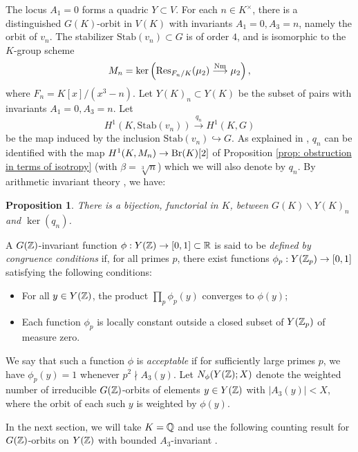 \documentclass[11pt,a4paper]{amsart}
\def\Z{{\rm \mathbb{Z}}}
\def\Q{{\rm \mathbb{Q}}}
\def\R{{\rm \mathbb{R}}}
\def\Nm{{\rm Nm}}
\def\Br{{\rm Br}}
\def\Res{{\rm Res}}
\numberwithin{equation}{section}
\newtheorem{proposition}[theorem]{Proposition}
\begin{document}
The locus $A_1 = 0$ forms a quadric $Y \subset V$. 
For each $n \in K^\times$, there is a distinguished $G(K)$-orbit in $V(K)$ with invariants $A_1 = 0,A_3 = n$, namely the orbit of $v_n$.  The stabilizer $\mathrm{Stab}(v_n) \subset G$ is of order $4$, and is isomorphic to the $K$-group scheme 
\[M_n = \ker\left(\Res_{F_n/K}(\mu_2) \stackrel{\Nm}{\longrightarrow} \mu_2\right),\]
where $F_n = K[x]/(x^3 - n)$.  Let $Y(K)_n \subset Y(K)$ be the subset of pairs with invariants $A_1 = 0,A_3 = n$. Let \[H^1(K, \mathrm{Stab}(v_n)) \stackrel{q_n}{\longrightarrow} H^1(K, G)\]
be the map induced by the inclusion $\mathrm{Stab}(v_n) \hookrightarrow G$. As explained in \cite{BhargavaGross2013}, $q_n$ can be identified with the map $H^1(K, M_n) \to \Br(K)[2]$ of Proposition \ref{prop: obstruction in terms of isotropy} (with $\beta = \sqrt[3]{n}$) which we will also denote by $q_n$. 
 By arithmetic invariant theory \cite[Proposition 1]{BhargavaGross2014}, we have:

\begin{proposition}\label{prop: parameterization}
There is a bijection, functorial in $K$, between $G(K)\backslash Y(K)_n$ and $\ker(q_n)$.
\end{proposition}




A $G(\Z)$-invariant function $\phi:Y({\Z})\to[0,1]\subset \R$ is said to be {\it defined by congruence conditions} if, for all primes $p$, there exist functions $\phi_p:Y({\Z_p})\to[0,1]$ satisfying the following conditions:
\begin{itemize}
\item[(1)] For all $y\in Y(\Z)$, the product $\prod_p\phi_p(y)$ converges to $\phi(y)$;
\item[(2)] Each function $\phi_p$ is 
locally constant outside a closed subset of $Y({\Z_p})$ of measure zero.
\end{itemize}
We say that such a function $\phi$ is {\it acceptable} if for
sufficiently large primes $p$, we have $\phi_{p}(y)=1$ whenever
$p^2 \nmid A_3(y)$.  Let $N_\phi(Y(\Z);X)$ denote the weighted number of irreducible  $G(\Z)$-orbits of elements $y\in Y(\Z)$ with $|A_3(y)|<X$, where the orbit of each such $y$ is weighted by $\phi(y)$. 

In the next section, we will take $K = \Q$ and use the following counting result for $G(\Z)$-orbits on $Y(\Z)$ with bounded $A_3$-invariant \cite[Theorem 4.1]{AlpogeBhargavaShnidman}.
\end{document}
